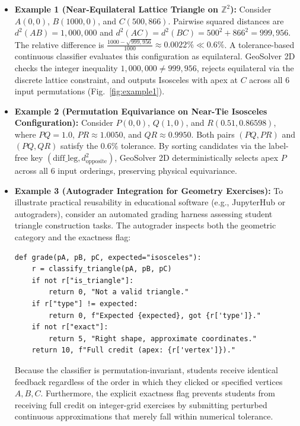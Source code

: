 \documentclass[preprint,12pt]{elsarticle}
\begin{document}
\begin{itemize}
\item \textbf{Example 1 (Near-Equilateral Lattice Triangle on $\mathbb{Z}^2$):} Consider $A(0, 0)$, $B(1000, 0)$, and $C(500, 866)$. Pairwise squared distances are $d^2(AB) = 1{,}000{,}000$ and $d^2(AC) = d^2(BC) = 500^2 + 866^2 = 999{,}956$. The relative difference is $\frac{1000 - \sqrt{999{,}956}}{1000} \approx 0.0022\% \ll 0.6\%$. A tolerance-based continuous classifier evaluates this configuration as equilateral. GeoSolver 2D checks the integer inequality $1{,}000{,}000 \ne 999{,}956$, rejects equilateral via the discrete lattice constraint, and outputs Isosceles with apex at $C$ across all 6 input permutations (Fig.~\ref{fig:example1}).

\item \textbf{Example 2 (Permutation Equivariance on Near-Tie Isosceles Configuration):} Consider $P(0, 0)$, $Q(1, 0)$, and $R(0.51, 0.86598)$, where $PQ = 1.0$, $PR \approx 1.0050$, and $QR \approx 0.9950$. Both pairs $(PQ, PR)$ and $(PQ, QR)$ satisfy the $0.6\%$ tolerance. By sorting candidates via the label-free key $(\text{diff\_leg}, d^2_{\text{opposite}})$, GeoSolver 2D deterministically selects apex $P$ across all 6 input orderings, preserving physical equivariance.

\item \textbf{Example 3 (Autograder Integration for Geometry Exercises):} To illustrate practical reusability in educational software (e.g., JupyterHub or autograders), consider an automated grading harness assessing student triangle construction tasks. The autograder inspects both the geometric category and the exactness flag:
{\small\begin{verbatim}
def grade(pA, pB, pC, expected="isosceles"):
    r = classify_triangle(pA, pB, pC)
    if not r["is_triangle"]:
        return 0, "Not a valid triangle."
    if r["type"] != expected:
        return 0, f"Expected {expected}, got {r['type']}."
    if not r["exact"]:
        return 5, "Right shape, approximate coordinates."
    return 10, f"Full credit (apex: {r['vertex']})."
\end{verbatim}}
Because the classifier is permutation-invariant, students receive identical feedback regardless of the order in which they clicked or specified vertices $A, B, C$. Furthermore, the explicit exactness flag prevents students from receiving full credit on integer-grid exercises by submitting perturbed continuous approximations that merely fall within numerical tolerance.
\end{itemize}
\end{document}
